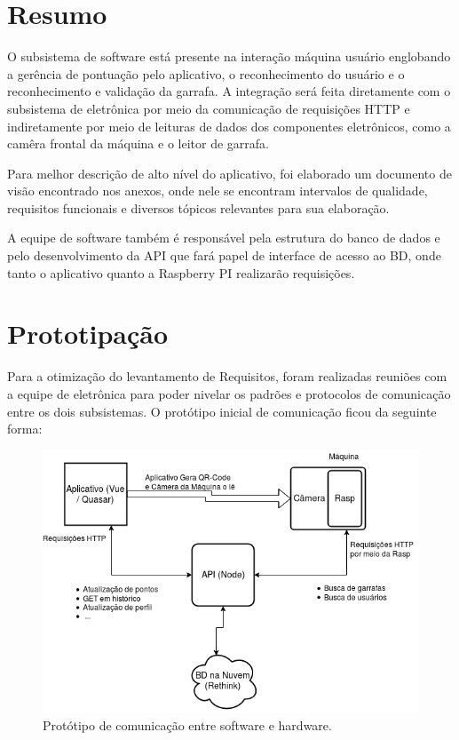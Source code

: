 \section{Resumo}
O subsistema de software está presente na interação máquina usuário englobando a gerência de pontuação pelo aplicativo, o reconhecimento do usuário e o reconhecimento e validação da garrafa. A integração será feita diretamente com o subsistema de eletrônica por meio da comunicação de requisições HTTP e indiretamente por meio de leituras de dados dos componentes eletrônicos, como a camêra frontal da máquina e o leitor de garrafa.

Para melhor descrição de alto nível do aplicativo, foi elaborado um documento de visão encontrado nos anexos, onde nele se encontram intervalos de qualidade, requisitos funcionais e diversos tópicos relevantes para sua elaboração.

A equipe de software também é responsável pela estrutura do banco de dados e pelo desenvolvimento da API que fará papel de interface de acesso ao BD, onde tanto o aplicativo quanto a Raspberry PI realizarão requisições.

\section{Prototipação}
Para a otimização do levantamento de Requisitos, foram realizadas reuniões com a equipe de eletrônica para poder nivelar os padrões e protocolos de comunicação entre os dois subsistemas. O protótipo inicial de comunicação ficou da seguinte forma:

\begin{figure}[!ht]
	\centering
		\includegraphics[scale=0.4]{figuras/software/1-comunicao-prototipo.png}
	\caption{Protótipo de comunicação entre software e hardware.}
\end{figure}

